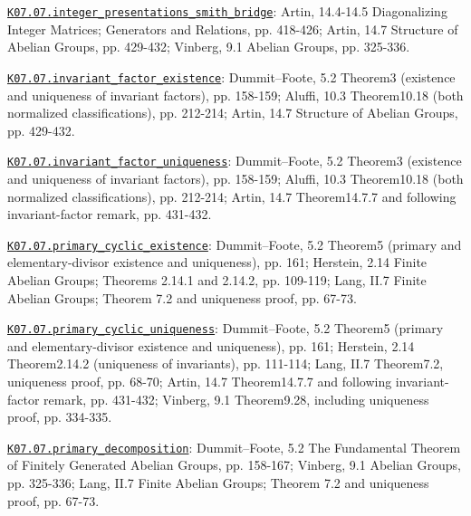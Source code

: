 \par\smallskip\noindent\hypertarget{src:K07.07.integer_presentations_smith_bridge}{}\label{src:K07.07.integer_presentations_smith_bridge}\hyperref[K07.07.integer_presentations_smith_bridge]{\texttt{K07.07.integer\_presentations\_smith\_bridge}}: Artin, 14.4-14.5 Diagonalizing Integer Matrices; Generators and Relations, pp. 418-426; Artin, 14.7 Structure of Abelian Groups, pp. 429-432; Vinberg, 9.1 Abelian Groups, pp. 325-336.
\par\smallskip\noindent\hypertarget{src:K07.07.invariant_factor_existence}{}\label{src:K07.07.invariant_factor_existence}\hyperref[K07.07.invariant_factor_existence]{\texttt{K07.07.invariant\_factor\_existence}}: Dummit--Foote, 5.2 Theorem3 (existence and uniqueness of invariant factors), pp. 158-159; Aluffi, 10.3 Theorem10.18 (both normalized classifications), pp. 212-214; Artin, 14.7 Structure of Abelian Groups, pp. 429-432.
\par\smallskip\noindent\hypertarget{src:K07.07.invariant_factor_uniqueness}{}\label{src:K07.07.invariant_factor_uniqueness}\hyperref[K07.07.invariant_factor_uniqueness]{\texttt{K07.07.invariant\_factor\_uniqueness}}: Dummit--Foote, 5.2 Theorem3 (existence and uniqueness of invariant factors), pp. 158-159; Aluffi, 10.3 Theorem10.18 (both normalized classifications), pp. 212-214; Artin, 14.7 Theorem14.7.7 and following invariant-factor remark, pp. 431-432.
\par\smallskip\noindent\hypertarget{src:K07.07.primary_cyclic_existence}{}\label{src:K07.07.primary_cyclic_existence}\hyperref[K07.07.primary_cyclic_existence]{\texttt{K07.07.primary\_cyclic\_existence}}: Dummit--Foote, 5.2 Theorem5 (primary and elementary-divisor existence and uniqueness), pp. 161; Herstein, 2.14 Finite Abelian Groups; Theorems 2.14.1 and 2.14.2, pp. 109-119; Lang, II.7 Finite Abelian Groups; Theorem 7.2 and uniqueness proof, pp. 67-73.
\par\smallskip\noindent\hypertarget{src:K07.07.primary_cyclic_uniqueness}{}\label{src:K07.07.primary_cyclic_uniqueness}\hyperref[K07.07.primary_cyclic_uniqueness]{\texttt{K07.07.primary\_cyclic\_uniqueness}}: Dummit--Foote, 5.2 Theorem5 (primary and elementary-divisor existence and uniqueness), pp. 161; Herstein, 2.14 Theorem2.14.2 (uniqueness of invariants), pp. 111-114; Lang, II.7 Theorem7.2, uniqueness proof, pp. 68-70; Artin, 14.7 Theorem14.7.7 and following invariant-factor remark, pp. 431-432; Vinberg, 9.1 Theorem9.28, including uniqueness proof, pp. 334-335.
\par\smallskip\noindent\hypertarget{src:K07.07.primary_decomposition}{}\label{src:K07.07.primary_decomposition}\hyperref[K07.07.primary_decomposition]{\texttt{K07.07.primary\_decomposition}}: Dummit--Foote, 5.2 The Fundamental Theorem of Finitely Generated Abelian Groups, pp. 158-167; Vinberg, 9.1 Abelian Groups, pp. 325-336; Lang, II.7 Finite Abelian Groups; Theorem 7.2 and uniqueness proof, pp. 67-73.
